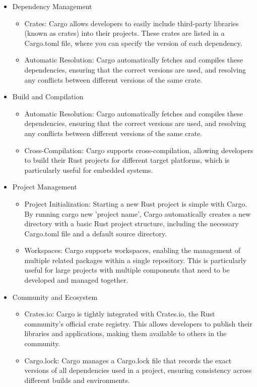 \begin{itemize}

	\item Dependency Management
	\begin{itemize}
		\item Crates: Cargo allows developers to easily include third-party libraries (known as crates) into their projects. These crates are listed in a Cargo.toml file, where you can specify the version of each dependency.
		\item Automatic Resolution: Cargo automatically fetches and compiles these dependencies, ensuring that the correct versions are used, and resolving any conflicts between different versions of the same crate.
	\end{itemize}

	\item Build and Compilation
	\begin{itemize}
		\item Automatic Resolution: Cargo automatically fetches and compiles these dependencies, ensuring that the correct versions are used, and resolving any conflicts between different versions of the same crate.
		\item Cross-Compilation: Cargo supports cross-compilation, allowing developers to build their Rust projects for different target platforms, which is particularly useful for embedded systems.
	\end{itemize}

	\item Project Management
	\begin{itemize}
		\item Project Initialization: Starting a new Rust project is simple with Cargo. By running cargo new 'project name', Cargo automatically creates a new directory with a basic Rust project structure, including the necessary Cargo.toml file and a default source directory.
		\item Workspaces: Cargo supports workspaces, enabling the management of multiple related packages within a single repository. This is particularly useful for large projects with multiple components that need to be developed and managed together.
	\end{itemize}

	\item Community and Ecosystem
	\begin{itemize}
		\item Crates.io: Cargo is tightly integrated with Crates.io, the Rust community's official crate registry. This allows developers to publish their libraries and applications, making them available to others in the community.
		\item Cargo.lock: Cargo manages a Cargo.lock file that records the exact versions of all dependencies used in a project, ensuring consistency across different builds and environments.
	\end{itemize}
\end{itemize}

